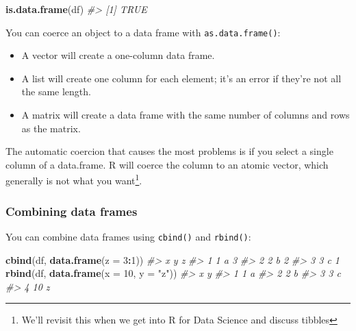 \documentclass[]{book}
\newenvironment{Shaded}{\begin{snugshade}}{\end{snugshade}}
\newcommand{\KeywordTok}[1]{\textcolor[rgb]{0.13,0.29,0.53}{\textbf{#1}}}
\newcommand{\DataTypeTok}[1]{\textcolor[rgb]{0.13,0.29,0.53}{#1}}
\newcommand{\DecValTok}[1]{\textcolor[rgb]{0.00,0.00,0.81}{#1}}
\newcommand{\StringTok}[1]{\textcolor[rgb]{0.31,0.60,0.02}{#1}}
\newcommand{\CommentTok}[1]{\textcolor[rgb]{0.56,0.35,0.01}{\textit{#1}}}
\newcommand{\OtherTok}[1]{\textcolor[rgb]{0.56,0.35,0.01}{#1}}
\newcommand{\OperatorTok}[1]{\textcolor[rgb]{0.81,0.36,0.00}{\textbf{#1}}}
\newcommand{\NormalTok}[1]{#1}
\let\rmarkdownfootnote\footnote%
\def\footnote{\protect\rmarkdownfootnote}
\theoremstyle{definition}
\theoremstyle{definition}
\theoremstyle{definition}
\theoremstyle{remark}
\begin{document}
\begin{Shaded}
\begin{Highlighting}[]
\KeywordTok{is.data.frame}\NormalTok{(df)}
\CommentTok{#> [1] TRUE}
\end{Highlighting}
\end{Shaded}

You can coerce an object to a data frame with \texttt{as.data.frame()}:

\begin{itemize}
\item
  A vector will create a one-column data frame.
\item
  A list will create one column for each element; it's an error if
  they're not all the same length.
\item
  A matrix will create a data frame with the same number of columns and
  rows as the matrix.
\end{itemize}

The automatic coercion that causes the most problems is if you select a
single column of a data.frame. R will coerce the column to an atomic
vector, which generally is not what you want\footnote{We'll revisit this
  when we get into R for Data Science and discuss tibbles}.

\begin{Shaded}
\end{Shaded}

\subsubsection{Combining data frames}\label{combining-data-frames}

You can combine data frames using \texttt{cbind()} and \texttt{rbind()}:

\begin{Shaded}
\begin{Highlighting}[]
\KeywordTok{cbind}\NormalTok{(df, }\KeywordTok{data.frame}\NormalTok{(}\DataTypeTok{z =} \DecValTok{3}\OperatorTok{:}\DecValTok{1}\NormalTok{))}
\CommentTok{#>   x y z}
\CommentTok{#> 1 1 a 3}
\CommentTok{#> 2 2 b 2}
\CommentTok{#> 3 3 c 1}
\KeywordTok{rbind}\NormalTok{(df, }\KeywordTok{data.frame}\NormalTok{(}\DataTypeTok{x =} \DecValTok{10}\NormalTok{, }\DataTypeTok{y =} \StringTok{"z"}\NormalTok{))}
\CommentTok{#>    x y}
\CommentTok{#> 1  1 a}
\CommentTok{#> 2  2 b}
\CommentTok{#> 3  3 c}
\CommentTok{#> 4 10 z}
\end{Highlighting}
\end{Shaded}
\end{document}
